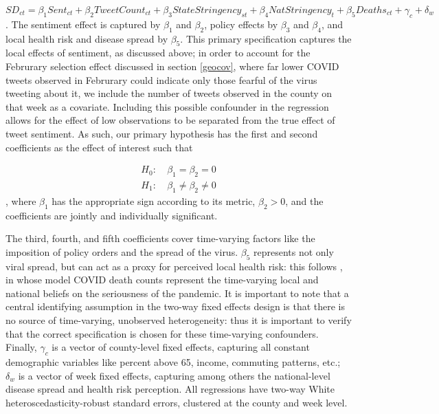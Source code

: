 \documentclass{article}
\begin{document}
\begin{equation}
  \label{eq:mainspec}
  SD_{ct} = \beta_1 Sent_{ct} + \beta_2 TweetCount_{ct} + \beta_3 StateStringency_{st} + \beta_4 NatStringency_{t} + \beta_5 Deaths_{ct} + \gamma_c + \delta_w
\end{equation}. The sentiment effect is captured by \(\beta_1\) and \(\beta_2\), policy effects by \(\beta_3\) and \(\beta_4\), and local health risk and disease spread by \(\beta_5\). This primary specification captures the local effects of sentiment, as discussed above; in order to account for the Februrary selection effect discussed in section \ref{geocov}, where far lower COVID tweets observed in Februrary could indicate only those fearful of the virus tweeting about it, we include the number of tweets observed in the county on that week as a covariate. Including this possible confounder in the regression allows for the effect of low observations to be separated from the true effect of tweet sentiment. As such, our primary hypothesis has the first and second coefficients as the effect of interest such that

\begin{align*}
  H_0 : &\: \beta_1 = \beta_2 = 0 \\
  H_1 : &\: \beta_1 \neq \beta_2 \neq 0
\end{align*}, where \(\beta_1\) has the appropriate sign according to its metric, \(\beta_2 > 0\), and the coefficients are jointly and individually significant.


The third, fourth, and fifth coefficients cover time-varying factors like the imposition of policy orders and the spread of the virus. \(\beta_5\) represents not only viral spread, but can act as a proxy for perceived local health risk: this follows \textcite{chernozhukovCausalImpactMasks2021}, in whose model COVID death counts represent the time-varying local and national beliefs on the seriousness of the pandemic. It is important to note that a central identifying assumption in the two-way fixed effects design is that there is no source of time-varying, unobserved heterogeneity: thus it is important to verify that the correct specification is chosen for these time-varying confounders. Finally, \(\gamma_c\) is a vector of county-level fixed effects, capturing all constant demographic variables like percent above 65, income, commuting patterns, etc.; \(\delta_w\) is a vector of week fixed effects, capturing among others the national-level disease spread and health risk perception. All regressions have two-way White heteroscedasticity-robust standard errors, clustered at the county and week level.
\end{document}
